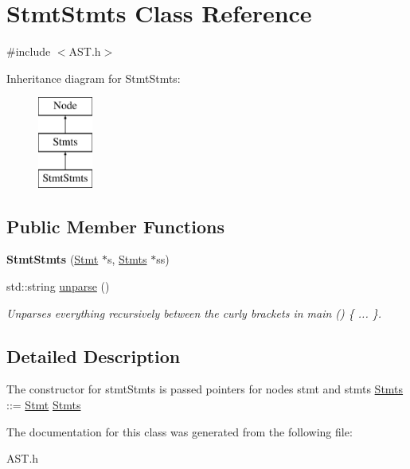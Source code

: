 \hypertarget{classStmtStmts}{\section{Stmt\-Stmts Class Reference}
\label{classStmtStmts}
}


{\ttfamily \#include $<$A\-S\-T.\-h$>$}

Inheritance diagram for Stmt\-Stmts\-:\begin{figure}[H]
\begin{center}
\leavevmode
\includegraphics[height=3.000000cm]{classStmtStmts}
\end{center}
\end{figure}
\subsection*{Public Member Functions}
\begin{DoxyCompactItemize}
\item 
\hypertarget{classStmtStmts_aaf6a30cff695500114fda8784a9f4810}{{\bfseries Stmt\-Stmts} (\hyperlink{classStmt}{Stmt} $\ast$s, \hyperlink{classStmts}{Stmts} $\ast$ss)}\label{classStmtStmts_aaf6a30cff695500114fda8784a9f4810}

\item 
\hypertarget{classStmtStmts_a834f10443d4c197b5741a00395f787eb}{std\-::string \hyperlink{classStmtStmts_a834f10443d4c197b5741a00395f787eb}{unparse} ()}\label{classStmtStmts_a834f10443d4c197b5741a00395f787eb}

\begin{DoxyCompactList}\small\item\em Unparses everything recursively between the curly brackets in main () \{ ... \}. \end{DoxyCompactList}\end{DoxyCompactItemize}


\subsection{Detailed Description}
The constructor for stmt\-Stmts is passed pointers for nodes stmt and stmts \hyperlink{classStmts}{Stmts} \-:\-:= \hyperlink{classStmt}{Stmt} \hyperlink{classStmts}{Stmts} 

The documentation for this class was generated from the following file\-:\begin{DoxyCompactItemize}
\item 
A\-S\-T.\-h\end{DoxyCompactItemize}
